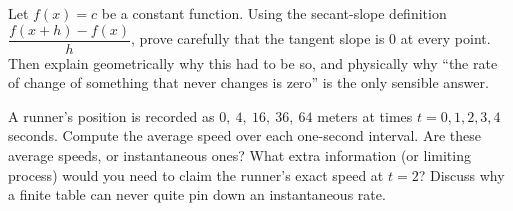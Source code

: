 \begin{exercise}
Let $f(x) = c$ be a constant function. Using the secant-slope definition
$\dfrac{f(x+h)-f(x)}{h}$, prove carefully that the tangent slope is $0$ at every
point. Then explain geometrically why this had to be so, and physically why ``the
rate of change of something that never changes is zero'' is the only sensible
answer.
\end{exercise}

\begin{exercise}
A runner's position is recorded as $0,\ 4,\ 16,\ 36,\ 64$ meters at times
$t = 0,1,2,3,4$ seconds. Compute the average speed over each one-second interval.
Are these average speeds, or instantaneous ones? What extra information (or
limiting process) would you need to claim the runner's exact speed at $t = 2$?
Discuss why a finite table can never quite pin down an instantaneous rate.
\end{exercise}

